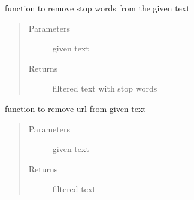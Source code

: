 \documentclass[letterpaper,10pt,english]{sphinxmanual}
\begin{document}

\begin{fulllineitems}
\label{\detokenize{index:data_preprocessing.data_preprocessing.remove_stopwords}}
\sphinxAtStartPar
function to remove stop words from the given text
\begin{quote}\begin{description}
\item[{Parameters}] \leavevmode
\sphinxAtStartPar
{} \textendash{} given text

\item[{Returns}] \leavevmode
\sphinxAtStartPar
filtered text with stop words

\end{description}\end{quote}

\end{fulllineitems}


\begin{fulllineitems}
\label{\detokenize{index:data_preprocessing.data_preprocessing.remove_urls}}
\sphinxAtStartPar
function to remove url from given text
\begin{quote}\begin{description}
\item[{Parameters}] \leavevmode
\sphinxAtStartPar
{} \textendash{} given text

\item[{Returns}] \leavevmode
\sphinxAtStartPar
filtered text

\end{description}\end{quote}

\end{fulllineitems}
\end{document}
